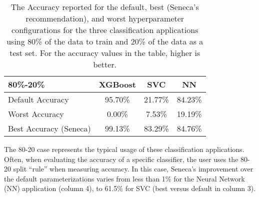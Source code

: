 \begin{table}
\centering
\begin{tabular}{|l|c|c|c|}
\hline
\textbf{80\%-20\%} & XGBoost & SVC & NN\\
\hline
\hline
Default Accuracy & 95.70\% & 21.77\% & 84.23\%\\
\hline
Worst Accuracy&0.00\%&7.53\% & 19.19\%\\
\hline
Best Accuracy (Seneca) &99.13\% & 83.29\% & 84.76\%\\
\hline

\end{tabular}
\caption{The Accuracy reported for the 
default, best (Seneca's recommendation), and worst hyperparameter configurations for 
the three classification applications using 80\% of the data to train and 20\%
of the data as a test set. 
For the accuracy values in the table, higher is better.
\label{tab:accuracy}}
\vspace{-0.2in}
\end{table}


The 80-20 case represents the typical usage of these classification
applications.  Often, when evaluating the accuracy of a specific classifier,
the user uses the 80-20 split ``rule'' when measuring accuracy.  In this case,
Seneca's improvement over the default parameterizations varies from less than
1\% for the Neural Network (NN) application (column 4), to 61.5\% for SVC
(best versus default in column 3).

